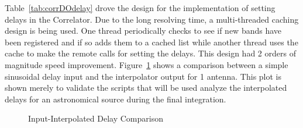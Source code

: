 \documentclass[11pt]{article}
\begin{document}
Table~\ref{tab:corrDOdelay} drove the design for the implementation of setting
delays in the Correlator. Due to the long resolving time, a 
multi-threaded caching design is being used. One thread periodically checks
to see if new bands have been registered and if so adds them to a
cached list while another thread uses the cache to make the remote calls
for setting the delays. This design had 2 orders of magnitude speed
improvement. Figure~\ref{fig:delay} shows a comparison between a simple
sinusoidal delay input and the interpolator output for 1 antenna. This
plot is shown merely to validate the scripts that will be used analyze the
interpolated delays for an astronomical source during the final integration.
\begin{figure}[!ht]
\hfil{}\hfil
\caption{Input-Interpolated Delay Comparison}
\label{fig:delay}
\end{figure}
\end{document}
